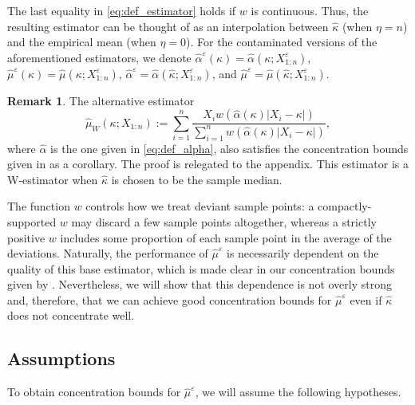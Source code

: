\documentclass{article}
\theoremstyle{plain}
\theoremstyle{definition}
\newtheorem{remark}{Remark}
\begin{document}
The last equality in \eqref{eq:def_estimator} holds if \( w \) is continuous. Thus, the resulting estimator can be thought of as an interpolation between \( \widehat{\kappa }  \) (when $\eta=n$) and the empirical mean (when $\eta=0$). For the contaminated versions of the aforementioned estimators, we denote \( \widehat{\alpha }^\varepsilon(\kappa )=\widehat{\alpha }(\kappa ; X_{1:n}^\varepsilon )\), \(  \widehat{\mu }^\varepsilon(\kappa )=\widehat{\mu }(\kappa; X_{1:n}^\varepsilon )\), \(  \widehat{\alpha  }^\varepsilon=\widehat{\alpha  }(\widehat{\kappa } ; X_{1:n}^\varepsilon )\), and \(  \widehat{\mu }^\varepsilon=\widehat{\mu }(\widehat{\kappa } ; X_{1:n}^\varepsilon )\).

\begin{remark}
The alternative estimator  \begin{equation}\label{eq:def_estimator_weighted}
  \widehat{\mu}_W(\kappa;X_{1:n} ):=\sum_{i=1}^n\frac{X_i w(\widehat{\alpha}(\kappa ) |X_i-\kappa|)}{\sum_{i=1}^nw(\widehat{\alpha }(\kappa )\lvert X_i-\kappa   \rvert  )},
\end{equation} 
where \( \widehat{\alpha }  \) is the one given in \eqref{eq:def_alpha}, also satisfies the concentration bounds given in  as a corollary. The proof is relegated to the appendix. This estimator is a W-estimator when \( \widehat{\kappa }  \) is chosen to be the sample median.
\end{remark}
The function $w$ controls how we treat deviant sample points: a compactly-supported $w$ may discard a few sample points altogether, whereas a strictly positive $w$ includes some proportion of each sample point in the average of the deviations. Naturally, the performance of \( \widehat{\mu}^\varepsilon   \) is necessarily dependent on the quality of this base estimator, which is made clear in our concentration bounds given by . Nevertheless, we will show that this dependence is not overly strong and, therefore, that we can achieve good concentration bounds for \( \widehat{\mu}^\varepsilon   \) even if $\widehat{\kappa} $ does not concentrate well.

\vspace{1em}

\subsection{Assumptions} To obtain concentration bounds for $\widehat{\mu}^\varepsilon $, we will assume the following hypotheses.
\end{document}
